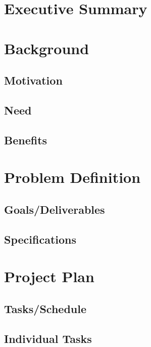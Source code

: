 \documentclass[12pt]{report}
\begin{document}

	\tableofcontents
	\clearpage

	\section{Executive Summary}

	\section{Background}
		\subsection{Motivation}

		\subsection{Need}

		\subsection{Benefits}

	\section{Problem Definition}
		\subsection{Goals/Deliverables}

		\subsection{Specifications}

	\section{Project Plan}
		\subsection{Tasks/Schedule}

		\subsection{Individual Tasks}
\end{document}

